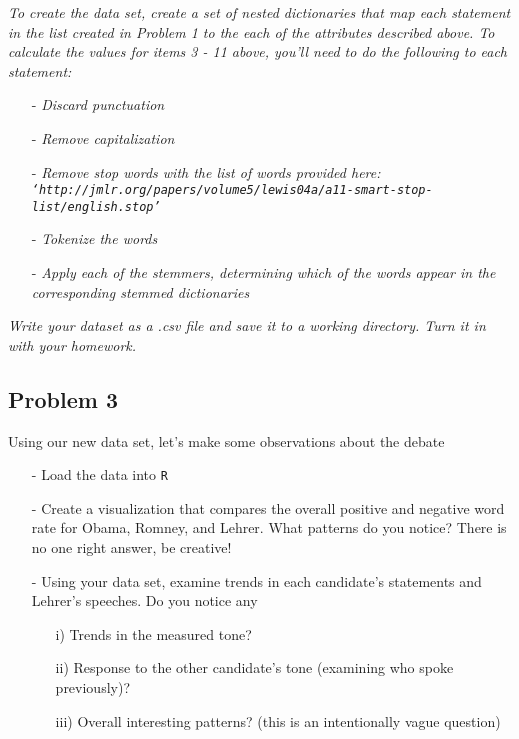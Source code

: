 \documentclass[12pt,letterpaper]{article}
\begin{document}
\noindent \textit{To create the data set, create a set of nested dictionaries that map each statement in the list created in Problem 1 to the each of the attributes described above. To  calculate the values for items 3 - 11 above, you'll need to do the following to each statement:}
\begin{itemize}
\item[-]  \textit{Discard punctuation}
\item[-]  \textit{Remove capitalization}
\item[-]  \textit{Remove stop words with the list of words provided here: \\
{\tt `http://jmlr.org/papers/volume5/lewis04a/a11-smart-stop-list/english.stop'}}
\item[-]  \textit{Tokenize the words}
\item[-] \textit{Apply each of the stemmers, determining which of the words appear in the corresponding stemmed dictionaries}
\end{itemize}

\noindent \textit{Write your dataset as a .csv file and save it to a working directory. Turn it in with your homework.}



\subsection*{Problem 3}

Using our new data set, let's make some observations about the debate
\begin{itemize}
\item[-] Load the data into {\tt R}
\item[-] Create a visualization that compares the overall positive and negative word rate for Obama, Romney, and Lehrer.  What patterns do you notice?  There is no one right answer, be creative!
\item[-] Using your data set, examine trends in each candidate's statements and Lehrer's speeches.  Do you notice any
\begin{itemize}
\item[i)] Trends in the measured tone?
\item[ii)] Response to the other candidate's tone (examining who spoke previously)?
\item[iii)] Overall interesting patterns? (this is an intentionally vague question)
\end{itemize}
\end{itemize}
\end{document}
